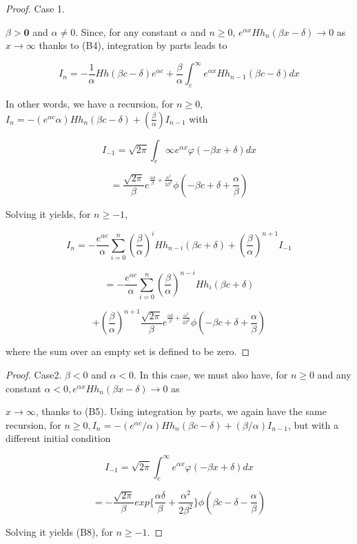 \begin{proof}{Case 1.}

$\beta>\mathbf{0}$ and $\alpha\neq0$. Since, for any constant $\alpha$ and $n \geq 0$, ${e^{\alpha x}} Hh_{n}(\beta x - \delta) \rightarrow 0$ as $x \rightarrow \infty$ thanks to (B4), integration by parts leads to

$$I_{n}=-\frac{1}{\alpha}Hh(\beta c -\delta) e^{\alpha c} + \frac{\beta}{\alpha}\int_{c}^{\infty} e^{\alpha x} Hh_{n-1}(\beta c - \delta)dx$$

In other words, we have a recursion, for $n \geq 0$, $I_{n}=-(e^{\alpha c}{\alpha})Hh_{n}(\beta c - \delta) + (\frac{\beta}{\alpha})I_{n-1}$ with

$$I_{-1}=\sqrt{2 \pi} \int_{c}{\infty}e^{\alpha x}\varphi(-\beta x +\delta)dx$$

$$=\frac{\sqrt{2 \pi}}{\beta} e^{\frac{\alpha \delta}{\beta}+\frac{\alpha^{2}}{2 \beta^{2}}}\phi(-\beta c + \delta +\frac{\alpha}{\beta})$$

Solving it yields, for $n \geq -1$,

$$I_{n}=-\frac{e^{\alpha c}}{\alpha}\sum_{i=0}^{n}(\frac{\beta}{\alpha})^{i}Hh_{n-i}(\beta c+\delta) + (\frac{\beta}{\alpha})^{n+1}I_{-1}$$

$$=-\frac{e^{\alpha c}}{\alpha}\sum_{i=0}^{n}(\frac{\beta}{\alpha})^{n-i} Hh_{i}(\beta c+\delta)$$

$$+ (\frac{\beta}{\alpha})^{n+1}\frac{\sqrt{2 \pi}}{\beta} e^{\frac{\alpha \delta}{\beta}+\frac{\alpha^{2}}{2 \beta^{2}}}\phi(-\beta c + \delta +\frac{\alpha}{\beta})$$

where the sum over an empty set is defined to be zero.
\end{proof}

\begin{proof}{Case2.} $\beta<0$ and $\alpha<0$. In this case, we must also have, for $n \geq 0$ and any constant $\alpha<0, e^{\alpha x}Hh_{n}(\beta x -\delta) \rightarrow 0$ as

$x \rightarrow \infty$, thanks to (B5). Using integration by parts, we again have the same recursion, for $n \geq 0, I_{n}=-(e^{\alpha c}/\alpha)Hh_{n}(\beta c - \delta)+(\beta / \alpha)I_{n-1}$, but with a different initial condition

$$I_{-1}=\sqrt{2 \pi}\int_{c}^{\infty}e^{\alpha x}\varphi(-\beta x + \delta)dx$$

$$=-\frac{\sqrt{2 \pi}}{\beta} exp\{\frac{\alpha \delta}{\beta}+\frac{\alpha^{2}}{2 \beta^{2}}\}\phi(\beta c - \delta -\frac{\alpha}{\beta})$$

Solving it yields (B8), for $n \geq -1$.

\end{proof}

